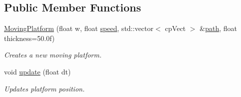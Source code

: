 \subsection*{Public Member Functions}
\begin{DoxyCompactItemize}
\item 
\hyperlink{class_moving_platform_ac33dba37c6bbd2e496f157ac5f2fcf6b}{Moving\+Platform} (float w, float \hyperlink{class_moving_platform_a71db6ff1f8e4b94445e096ca62d79df4}{speed}, std\+::vector$<$ cp\+Vect $>$ \&\hyperlink{class_moving_platform_a35dc1c58256404b865365f634588ce38}{path}, float thickness=50.\+0f)
\begin{DoxyCompactList}\small\item\em Creates a new moving platform. \end{DoxyCompactList}\item 
void \hyperlink{class_moving_platform_a9eb48b9e90a70b28f6c71ec2673a66cc}{update} (float dt)
\begin{DoxyCompactList}\small\item\em Updates platform position. \end{DoxyCompactList}\end{DoxyCompactItemize}
